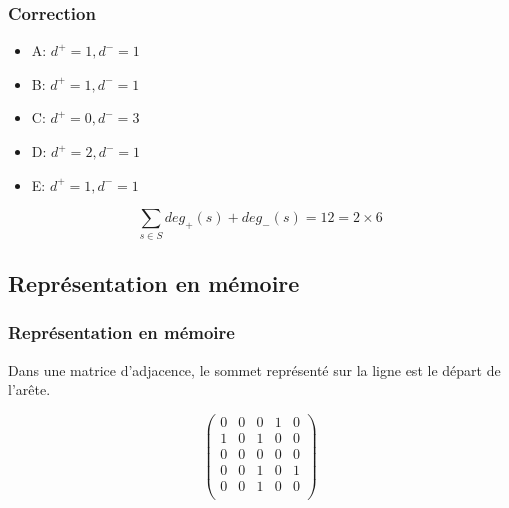 \documentclass[svgnames,11pt]{beamer}
\begin{document}
\begin{frame}
    \frametitle{Correction}

        \begin{itemize}
            \item A: $d^+=1, d^-=1$
            \item B: $d^+=1, d^-=1$
            \item C: $d^+=0, d^-=3$
            \item D: $d^+=2, d^-=1$
            \item E: $d^+=1, d^-=1$
        \end{itemize}
    \vspace{2em}
    $$\sum_{s\in S}{deg_+(s)+deg_-(s)}=12=2×6$$
\end{frame}
\subsection{Représentation en mémoire}
\begin{frame}
    \frametitle{Représentation en mémoire}

    \begin{aretenir}[]
        Dans une matrice d'adjacence, le sommet représenté sur la ligne est le départ de l'arête.
    \end{aretenir}
    \begin{multicols}{2}
        \begin{center}
        \end{center}

        $$\begin{pmatrix}
                0 & 0 & 0 & 1 & 0 \\
                1 & 0 & 1 & 0 & 0 \\
                0 & 0 & 0 & 0 & 0 \\
                0 & 0 & 1 & 0 & 1 \\
                0 & 0 & 1 & 0 & 0 \\
            \end{pmatrix}$$
    \end{multicols}

\end{frame}
\end{document}
